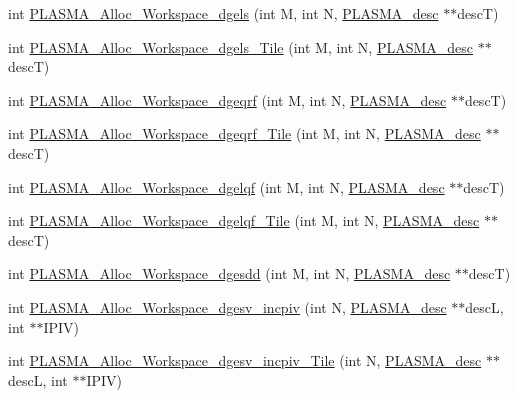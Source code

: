 \begin{DoxyCompactItemize}
\item 
int \hyperlink{group__Auxiliary_ga790f08850f4c0a5c84ab2e3327056144_ga790f08850f4c0a5c84ab2e3327056144}{P\+L\+A\+S\+M\+A\+\_\+\+Alloc\+\_\+\+Workspace\+\_\+dgels} (int M, int N, \hyperlink{structplasma__desc__t}{P\+L\+A\+S\+M\+A\+\_\+desc} $\ast$$\ast$desc\+T)
\item 
int \hyperlink{group__Auxiliary_ga33557544916472357ad30330e006654a_ga33557544916472357ad30330e006654a}{P\+L\+A\+S\+M\+A\+\_\+\+Alloc\+\_\+\+Workspace\+\_\+dgels\+\_\+\+Tile} (int M, int N, \hyperlink{structplasma__desc__t}{P\+L\+A\+S\+M\+A\+\_\+desc} $\ast$$\ast$desc\+T)
\item 
int \hyperlink{group__Auxiliary_ga165e4fbecb444a4235bd73c3f110cac0_ga165e4fbecb444a4235bd73c3f110cac0}{P\+L\+A\+S\+M\+A\+\_\+\+Alloc\+\_\+\+Workspace\+\_\+dgeqrf} (int M, int N, \hyperlink{structplasma__desc__t}{P\+L\+A\+S\+M\+A\+\_\+desc} $\ast$$\ast$desc\+T)
\item 
int \hyperlink{group__Auxiliary_gaa47a059a69e9588b718c95927a9ed704_gaa47a059a69e9588b718c95927a9ed704}{P\+L\+A\+S\+M\+A\+\_\+\+Alloc\+\_\+\+Workspace\+\_\+dgeqrf\+\_\+\+Tile} (int M, int N, \hyperlink{structplasma__desc__t}{P\+L\+A\+S\+M\+A\+\_\+desc} $\ast$$\ast$desc\+T)
\item 
int \hyperlink{group__Auxiliary_gaa20ca30924ee528e9a8ed0d5086177a6_gaa20ca30924ee528e9a8ed0d5086177a6}{P\+L\+A\+S\+M\+A\+\_\+\+Alloc\+\_\+\+Workspace\+\_\+dgelqf} (int M, int N, \hyperlink{structplasma__desc__t}{P\+L\+A\+S\+M\+A\+\_\+desc} $\ast$$\ast$desc\+T)
\item 
int \hyperlink{group__Auxiliary_ga21ffb1fdec8a61f0a8f166064ccf17ce_ga21ffb1fdec8a61f0a8f166064ccf17ce}{P\+L\+A\+S\+M\+A\+\_\+\+Alloc\+\_\+\+Workspace\+\_\+dgelqf\+\_\+\+Tile} (int M, int N, \hyperlink{structplasma__desc__t}{P\+L\+A\+S\+M\+A\+\_\+desc} $\ast$$\ast$desc\+T)
\item 
int \hyperlink{group__Auxiliary_ga02218a4aa0d1ad6c51a7361d83c6d366_ga02218a4aa0d1ad6c51a7361d83c6d366}{P\+L\+A\+S\+M\+A\+\_\+\+Alloc\+\_\+\+Workspace\+\_\+dgesdd} (int M, int N, \hyperlink{structplasma__desc__t}{P\+L\+A\+S\+M\+A\+\_\+desc} $\ast$$\ast$desc\+T)
\item 
int \hyperlink{group__Auxiliary_gaa520e33cbbf04fe3fb51641da2518ebf_gaa520e33cbbf04fe3fb51641da2518ebf}{P\+L\+A\+S\+M\+A\+\_\+\+Alloc\+\_\+\+Workspace\+\_\+dgesv\+\_\+incpiv} (int N, \hyperlink{structplasma__desc__t}{P\+L\+A\+S\+M\+A\+\_\+desc} $\ast$$\ast$desc\+L, int $\ast$$\ast$I\+P\+I\+V)
\item 
int \hyperlink{group__Auxiliary_ga66b5ff03b5f49a3319d96db13626f1ed_ga66b5ff03b5f49a3319d96db13626f1ed}{P\+L\+A\+S\+M\+A\+\_\+\+Alloc\+\_\+\+Workspace\+\_\+dgesv\+\_\+incpiv\+\_\+\+Tile} (int N, \hyperlink{structplasma__desc__t}{P\+L\+A\+S\+M\+A\+\_\+desc} $\ast$$\ast$desc\+L, int $\ast$$\ast$I\+P\+I\+V)
$$
\end{DoxyCompactItemize}

